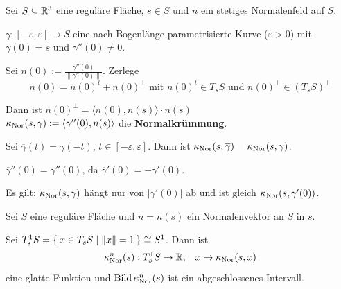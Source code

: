 \begin{definition}\label{def:18.4}%
    Sei $S \subseteq \mathbb{R}^3$ eine reguläre Fläche, $s \in S$ und $n$ ein
    stetiges Normalenfeld auf $S$.

    $\gamma:[-\varepsilon, \varepsilon] \rightarrow S$ eine nach
    Bogenlänge parametrisierte Kurve ($\varepsilon > 0$) mit
    $\gamma(0) = s$ und $\gamma''(0) \neq 0$.

    Sei $n(0) := \frac{\gamma''(0)}{\|\gamma''(0)\|}$. Zerlege
    \[n(0) = n(0)^t + n(0)^\perp \text{ mit } n(0)^t \in T_s S \text{ und } n(0)^\perp \in (T_s S)^\perp\]

    Dann ist $n(0)^\perp = \langle n(0), n(s) \rangle \cdot n(s)$\\
    $\kappa_{\textnormal{Nor}}(s, \gamma) := \langle \gamma''(0), n(s) \rangle$
    die \textbf{Normalkrümmung}.
\end{definition}

\begin{bemerkung}
    Sei $\overline{\gamma}(t) = \gamma(-t)$, $t \in [- \varepsilon, \varepsilon]$.
    Dann ist $\kappa_{\textnormal{Nor}}(s, \overline{\gamma}) = \kappa_{\textnormal{Nor}}(s, \gamma)$.
\end{bemerkung}

\begin{beweis}
    $\overline{\gamma}''(0) = \gamma''(0)$, da $\overline{\gamma}'(0) = - \gamma'(0)$.

    Es gilt: $\kappa_{\textnormal{Nor}}(s,\gamma)$ hängt nur von $|\gamma'(0)|$ ab
    und ist gleich $\kappa_{\textnormal{Nor}}(s, \gamma'(0))$.
\end{beweis}

\begin{bemerkung}%
    Sei $S$ eine reguläre Fläche und $n=n(s)$ ein Normalenvektor an
    $S$ in $s$.

    Sei $T_{s}^{1} S = \Set{x \in T_s S | \|x\| = 1} \cong S^1$.
    Dann ist
    \[ \kappa_{\textnormal{Nor}}^n(s): T^1_s S \rightarrow \mathbb{R}, \;\;\; x \mapsto \kappa_{\textnormal{Nor}}(s,x)\]
    eine glatte Funktion und
    $\operatorname{Bild} \kappa_{\textnormal{Nor}}^n(s)$ ist ein abgeschlossenes Intervall.
\end{bemerkung}

